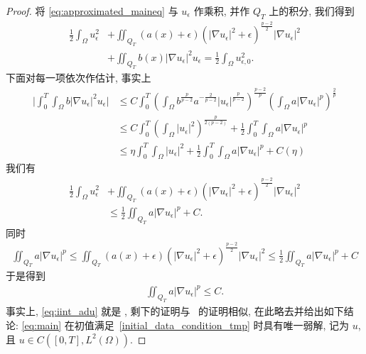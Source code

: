 \documentclass[twoside,longtitle]{LZUthesis}
\theoremstyle{definition}
\numberwithin{equation}{chapter}
\newcommand*\abs[1]{\lvert#1\rvert}
\begin{document}
\begin{proof}
	将 \cref{eq:approximated_maineq} 与 $u_\epsilon$ 作乘积, 并作 $Q_T$ 上的积分, 我们得到
	\begin{equation}
		\begin{split}
			\frac{1}{2} \int_{\Omega} u_{\epsilon}^{2}
			&+\iint_{Q_{T}}(a(x)+\epsilon)\left(\left|\nabla u_{\epsilon}\right|^{2}+\epsilon\right)^{\frac{p-2}{2}}\left|\nabla u_{\epsilon}\right|^{2}\\
			&+\iint_{Q_{T}} b(x)\left|\nabla u_{\epsilon}\right|^{2} u_{\epsilon}  =\frac{1}{2} \int_{\Omega} u_{\epsilon, 0}^{2}.
		\end{split}
	\end{equation}
	下面对每一项依次作估计, 事实上
	\begin{equation}
		\begin{split}
			\abs{\int_0^T\int_{\Omega} b\abs{\nabla u_{\epsilon}}^2u_{\epsilon}}
			&\leq C\int_0^T\left( \int_{\Omega} b^{\frac{p}{p-2}}a^{-\frac{2}{p-2}}\abs{u_{\epsilon}}^{\frac{p}{p-2}} \right)^{\frac{p-2}{p}}
			\left(  \int_{\Omega} a\abs{\nabla u_{\epsilon}}^p \right)^{\frac{2}{p}}\\
			&\leq C\int_0^T\left(\int_{\Omega}\abs{u_{\epsilon}}^2\right)^{\frac{p}{2(p-2)}} + \frac{1}{2}\int_0^T\int_{\Omega} a\abs{\nabla u_{\epsilon}}^p\\
			&\leq \eta\int_0^T\int_{\Omega}\abs{u_{\epsilon}}^2 + \frac{1}{2}\int_0^T\int_{\Omega} a\abs{\nabla u_{\epsilon}}^p + C(\eta)
		\end{split}
	\end{equation}
	我们有
	\begin{equation}
		\begin{split}
			\frac{1}{2} \int_{\Omega} u_{\epsilon}^{2}
			&+\iint_{Q_{T}}(a(x)+\epsilon)\left(\left|\nabla u_{\epsilon}\right|^{2}+\epsilon\right)^{\frac{p-2}{2}}\left|\nabla u_{\epsilon}\right|^{2}\\
			&\leq \frac{1}{2}\iint_{Q_T}a\abs{\nabla u_\epsilon}^p + C.
		\end{split}
	\end{equation}
	同时
	\begin{equation}
		\begin{split}
			\iint_{Q_T}a\abs{\nabla u_\epsilon}^p
			\leq \iint_{Q_{T}}(a(x)+\epsilon)\left(\left|\nabla u_{\epsilon}\right|^{2}+\epsilon\right)^{\frac{p-2}{2}}\left|\nabla u_{\epsilon}\right|^{2}
			\leq \frac{1}{2}\iint_{Q_T}a\abs{\nabla u_\epsilon}^p + C
		\end{split}
	\end{equation}
	于是得到
	\begin{equation}\label{eq:iint_adu}
		\begin{split}
			\iint_{Q_T}a\abs{\nabla u_\epsilon}^p \leq C.
		\end{split}
	\end{equation}
	事实上, \cref{eq:iint_adu} 就是 \cite[定理 1.3 式(2.5)]{Zhan2019Uniquenessa},
	剩下的证明与~\cite[thm 1.3]{Zhan2019Uniquenessa} 的证明相似, 在此略去并给出如下结论:
	\cref{eq:main} 在初值满足~\eqref{initial_data_condition_tmp} 时具有唯一弱解, 记为 $u$,
	且 $u \in C([0, T], L^2(\Omega))$.


\end{proof}
\end{document}
